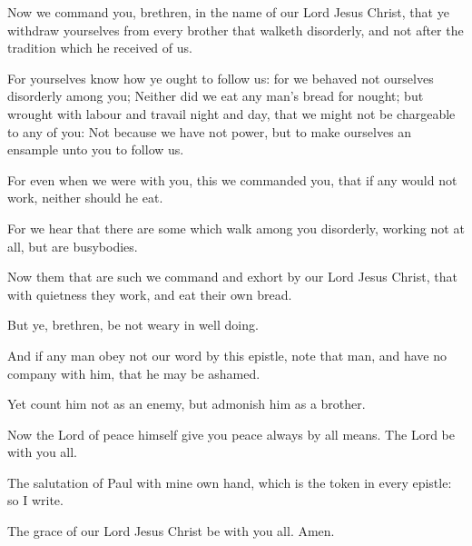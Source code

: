 \verse Now we command you, brethren, in the name of our Lord Jesus Christ, that ye withdraw yourselves from every brother that walketh disorderly, and not after the tradition which he received of us.

\verse For yourselves know how ye ought to follow us: for we behaved not ourselves disorderly among you; \verse Neither did we eat any man's bread for nought; but wrought with labour and travail night and day, that we might not be chargeable to any of you: \verse Not because we have not power, but to make ourselves an ensample unto you to follow us.

\verse For even when we were with you, this we commanded you, that if any would not work, neither should he eat.

\verse For we hear that there are some which walk among you disorderly, working not at all, but are busybodies.

\verse Now them that are such we command and exhort by our Lord Jesus Christ, that with quietness they work, and eat their own bread.

\verse But ye, brethren, be not weary in well doing.

\verse And if any man obey not our word by this epistle, note that man, and have no company with him, that he may be ashamed.

\verse Yet count him not as an enemy, but admonish him as a brother.

\verse Now the Lord of peace himself give you peace always by all means.  The Lord be with you all.

\verse The salutation of Paul with mine own hand, which is the token in every epistle: so I write.

\verse The grace of our Lord Jesus Christ be with you all. Amen.

